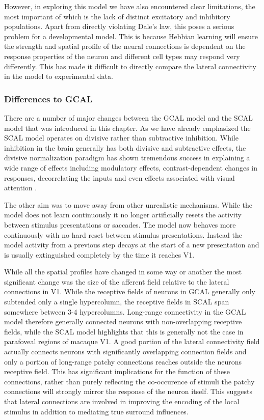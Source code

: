 However, in exploring this model we have also encountered clear
limitations, the most important of which is the lack of distinct
excitatory and inhibitory populations. Apart from directly violating
Dale's law, this poses a serious problem for a developmental model.
This is because Hebbian learning will ensure the strength and spatial
profile of the neural connections is dependent on the response
properties of the neuron and different cell types may respond very
differently. This has made it difficult to directly compare the
lateral connectivity in the model to experimental data.

\subsubsection{Differences to GCAL}

There are a number of major changes between the GCAL model and the
SCAL model that was introduced in this chapter. As we have already
emphasized the SCAL model operates on divisive rather than subtractive
inhibition. While inhibition in the brain generally has both divisive
and subtractive effects, the divisive normalization paradigm has shown
tremendous success in explaining a wide range of effects including
modulatory effects, contrast-dependent changes in responses,
decorrelating the inputs and even effects associated with visual
attention \citep{Cavanaugh2002a, Graham2011, Carandini2012,
  Reynaud2012, Coen2015}.

The other aim was to move away from other unrealistic
mechanisms. While the model does not learn continuously it no longer
artificially resets the activity between stimulus presentations or
saccades. The model now behaves more continuously with no hard reset
between stimulus presentations. Instead the model activity from a
previous step decays at the start of a new presentation and is usually
extinguished completely by the time it reaches V1.

While all the spatial profiles have changed in some way or another the
most significant change was the size of the afferent field relative to
the lateral connections in V1. While the receptive fields of neurons
in GCAL generally only subtended only a single hypercolumn, the
receptive fields in SCAL span somewhere between 3-4
hypercolumns. Long-range connectivity in the GCAL model therefore
generally connected neurons with non-overlapping receptive fields,
while the SCAL model highlights that this is generally not the case in
parafoveal regions of macaque V1. A good portion of the lateral
connectivity field actually connects neurons with significantly
overlapping connection fields and only a portion of long-range patchy
connections reaches outside the neurons receptive field. This has
significant implications for the function of these connections, rather
than purely reflecting the co-occurence of stimuli the patchy
connections will strongly mirror the response of the neuron
itself. This suggests that lateral connections are involved in
improving the encoding of the local stimulus in addition to mediating
true surround influences.

